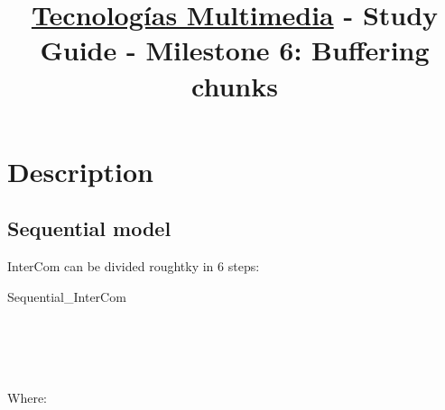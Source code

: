 \title{\href{https://www.ual.es/estudios/grados/presentacion/plandeestudios/asignatura/4015/40154321?idioma=zh_CN}{Tecnologías Multimedia} - Study Guide - Milestone 6: Buffering chunks}

\maketitle

\section{Description}

\subsection{Sequential model}

InterCom can be divided roughtky in 6 steps:

\begin{pseudocode}{Sequential\_InterCom}{~}
  \BEGIN
     \GETS {}\\
     \GETS {}\\
    \\
     \GETS {}\\
     \GETS {}\\
  \END
\end{pseudocode}

Where:

